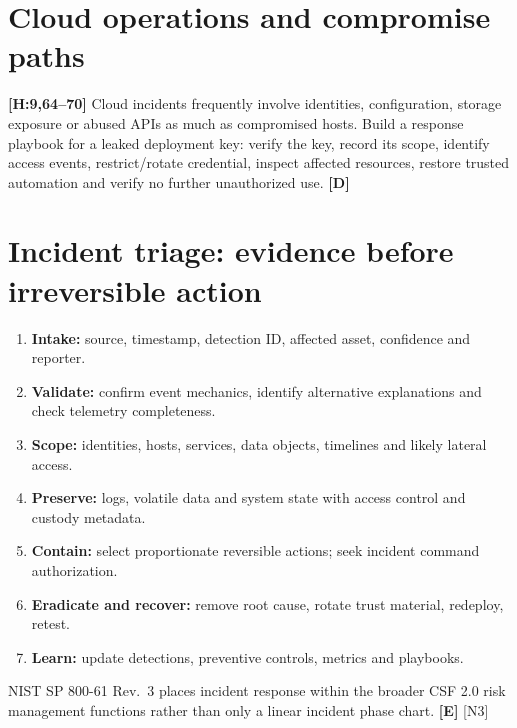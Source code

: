 \documentclass[10pt,letterpaper,oneside]{article}
\newcommand{\handbookref}[1]{\textsf{\color{accent}\textbf{[H:#1]}}}
\newcommand{\modernext}{\textsf{\color{muted}\textbf{[E]}}}
\newcommand{\designed}{\textsf{\color{accent}\textbf{[D]}}}
\begin{document}
\section{Cloud operations and compromise paths}
\handbookref{9,64--70} Cloud incidents frequently involve identities, configuration, storage exposure or abused APIs as much as compromised hosts. Build a response playbook for a leaked deployment key: verify the key, record its scope, identify access events, restrict/rotate credential, inspect affected resources, restore trusted automation and verify no further unauthorized use. \designed{}

\section{Incident triage: evidence before irreversible action}
\begin{enumerate}
\item \textbf{Intake:} source, timestamp, detection ID, affected asset, confidence and reporter.
\item \textbf{Validate:} confirm event mechanics, identify alternative explanations and check telemetry completeness.
\item \textbf{Scope:} identities, hosts, services, data objects, timelines and likely lateral access.
\item \textbf{Preserve:} logs, volatile data and system state with access control and custody metadata.
\item \textbf{Contain:} select proportionate reversible actions; seek incident command authorization.
\item \textbf{Eradicate and recover:} remove root cause, rotate trust material, redeploy, retest.
\item \textbf{Learn:} update detections, preventive controls, metrics and playbooks.
\end{enumerate}
NIST SP 800-61 Rev.~3 places incident response within the broader CSF 2.0 risk management functions rather than only a linear incident phase chart. \modernext{} [N3]
\end{document}

